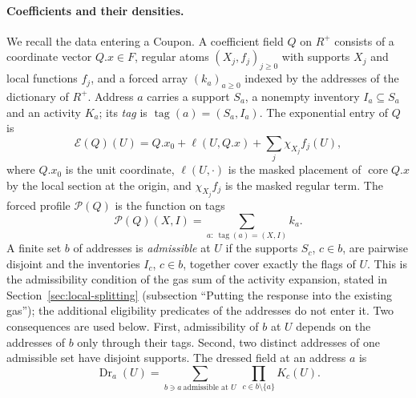 \paragraph{Coefficients and their densities.}
We recall the data entering a Coupon. A coefficient field $Q$ on $R^+$
consists of a coordinate vector $Q.x\in F$, regular atoms
$(X_j,f_j)_{j\ge0}$ with supports $X_j$ and local functions $f_j$, and
a forced array $(k_a)_{a\ge0}$ indexed by the addresses of the
dictionary of $R^+$. Address $a$ carries a support $S_a$, a nonempty
inventory $I_a\subseteq S_a$ and an activity $K_a$; its \emph{tag} is
$\operatorname{tag}(a)=(S_a,I_a)$. The exponential entry of $Q$ is
\[
 \mathcal E(Q)(U)=Q.x_0+\ell(U,Q.x)
   +\sum_j\chi_{X_j}f_j(U),
\]
where $Q.x_0$ is the unit coordinate, $\ell(U,\cdot)$ is the masked
placement of $\operatorname{core}Q.x$ by the local section at the
origin, and $\chi_{X_j}f_j$ is the masked regular term. The forced
profile $\mathcal P(Q)$ is the function on tags
\[
 \mathcal P(Q)(X,I)=\sum_{a:\ \operatorname{tag}(a)=(X,I)}k_a .
\]
A finite set $b$ of addresses is \emph{admissible} at $U$ if the
supports $S_c$, $c\in b$, are pairwise disjoint and the inventories
$I_c$, $c\in b$, together cover exactly the flags of $U$. This is the
admissibility condition of the gas sum of the activity expansion,
stated in Section~\ref{sec:local-splitting} (subsection ``Putting the
response into the existing gas''); the additional eligibility predicates
of the addresses do not enter it. Two consequences are used below.
First, admissibility of $b$ at $U$ depends on the addresses of $b$ only
through their tags. Second, two distinct addresses of one admissible
set have disjoint supports. The dressed field at an address $a$ is
\[
 \operatorname{Dr}_a(U)=\sum_{b\ni a\ \text{admissible at }U}
            \ \prod_{c\in b\setminus\{a\}}K_c(U).
\]

